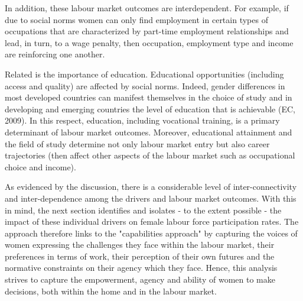 In addition, these labour market outcomes are interdependent. For example, if due to social norms women can only find employment in certain types of occupations that are characterized by part-time employment relationships and lead, in turn, to a wage penalty, then occupation, employment type and income are reinforcing one another.

Related is the importance of education. Educational opportunities (including access and quality) are affected by social norms. Indeed, gender differences in most developed countries can manifest themselves in the choice of study and in developing and emerging countries the level of education that is achievable (EC, 2009). In this respect, education, including vocational training, is a primary determinant of labour market outcomes. Moreover, educational attainment and the field of study determine not only labour market entry but also career trajectories (then affect other aspects of the labour market such as occupational choice and income). 

As evidenced by the discussion, there is a considerable level of inter-connectivity and inter-dependence among the drivers and labour market outcomes. With this in mind, the next section identifies and isolates - to the extent possible - the impact of these individual drivers on female labour force participation rates. The approach therefore links to the  "capabilities approach"  by capturing the voices of women expressing the challenges they face within the labour market, their preferences in terms of work, their perception of their own futures and the normative constraints on their agency which they face. Hence, this analysis strives to capture the empowerment, agency and ability of women to make decisions, both within the home and in the labour market.
